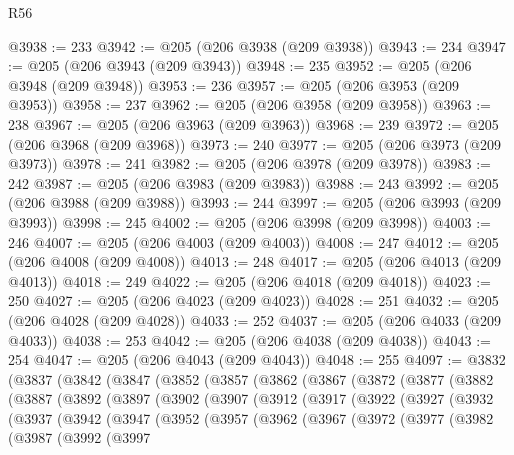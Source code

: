 \begin{lexlean}{R56}
\begin{coremodule}
@3938 := 233
@3942 := @205 (@206 @3938 (@209 @3938))
@3943 := 234
@3947 := @205 (@206 @3943 (@209 @3943))
@3948 := 235
@3952 := @205 (@206 @3948 (@209 @3948))
@3953 := 236
@3957 := @205 (@206 @3953 (@209 @3953))
@3958 := 237
@3962 := @205 (@206 @3958 (@209 @3958))
@3963 := 238
@3967 := @205 (@206 @3963 (@209 @3963))
@3968 := 239
@3972 := @205 (@206 @3968 (@209 @3968))
@3973 := 240
@3977 := @205 (@206 @3973 (@209 @3973))
@3978 := 241
@3982 := @205 (@206 @3978 (@209 @3978))
@3983 := 242
@3987 := @205 (@206 @3983 (@209 @3983))
@3988 := 243
@3992 := @205 (@206 @3988 (@209 @3988))
@3993 := 244
@3997 := @205 (@206 @3993 (@209 @3993))
@3998 := 245
@4002 := @205 (@206 @3998 (@209 @3998))
@4003 := 246
@4007 := @205 (@206 @4003 (@209 @4003))
@4008 := 247
@4012 := @205 (@206 @4008 (@209 @4008))
@4013 := 248
@4017 := @205 (@206 @4013 (@209 @4013))
@4018 := 249
@4022 := @205 (@206 @4018 (@209 @4018))
@4023 := 250
@4027 := @205 (@206 @4023 (@209 @4023))
@4028 := 251
@4032 := @205 (@206 @4028 (@209 @4028))
@4033 := 252
@4037 := @205 (@206 @4033 (@209 @4033))
@4038 := 253
@4042 := @205 (@206 @4038 (@209 @4038))
@4043 := 254
@4047 := @205 (@206 @4043 (@209 @4043))
@4048 := 255
@4097 := @3832
    (@3837
      (@3842
        (@3847
          (@3852
            (@3857
              (@3862
                (@3867
                  (@3872
                    (@3877
                      (@3882
                        (@3887
                          (@3892
                            (@3897
                              (@3902
                                (@3907
                                  (@3912
                                    (@3917
                                      (@3922
                                        (@3927
                                          (@3932
                                            (@3937
                                              (@3942
                                                (@3947
                                                  (@3952
                                                    (@3957
                                                      (@3962
                                                        (@3967
                                                          (@3972
                                                            (@3977
                                                              (@3982
                                                                (@3987
                                                                  (@3992
                                                                    (@3997

\end{coremodule}
\end{lexlean}
